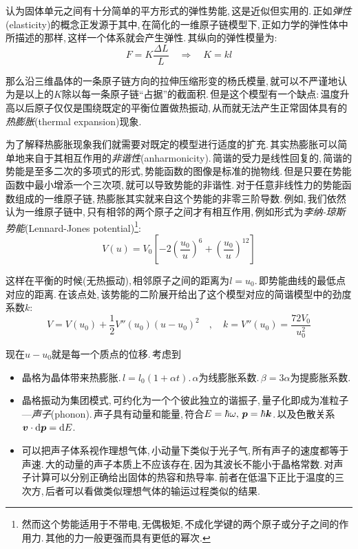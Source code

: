 认为固体单元之间有十分简单的平方形式的弹性势能,\,这是近似但实用的.\,正如\emph{弹性}(elasticity)的概念正发源于其中,\,在简化的一维原子链模型下,\,正如力学的弹性体中所描述的那样,\,这样一个体系就会产生弹性.\,其纵向的弹性模量为:
\[F=K\frac{\Delta L}{L}\quad \Rightarrow \quad K=kl\]

那么沿三维晶体的一条原子链方向的拉伸压缩形变的杨氏模量,\,就可以不严谨地认为是以上的$K$除以每一条原子链``占据''的截面积.\,但是这个模型有一个缺点:\,温度升高以后原子仅仅是围绕既定的平衡位置做热振动,\,从而就无法产生正常固体具有的\emph{热膨胀}(thermal expansion)现象.

为了解释热膨胀现象我们就需要对既定的模型进行适度的扩充.\,其实热膨胀可以简单地来自于其相互作用的\emph{非谐性}(anharmonicity).\,简谐的受力是线性回复的,\,简谐的势能是至多二次的多项式的形式,\,势能函数的图像是标准的抛物线.\,但是只要在势能函数中最小增添一个三次项,\,就可以导致势能的非谐性.\,对于任意非线性力的势能函数组成的一维原子链,\,热膨胀其实就来自这个势能的非零三阶导数.\,例如,\,我们依然认为一维原子链中,\,只有相邻的两个原子之间才有相互作用,\,例如形式为\emph{李纳-琼斯势能}(Lennard-Jones potential)\footnote{然而这个势能适用于不带电,\,无偶极矩,\,不成化学键的两个原子或分子之间的作用力.\,其他的力一般更强而具有更低的幂次.}:
\[V(u)=V_0  \left[ -2\left( \frac{u_0}{u} \right)^6+ \left( \frac{u_0}{u} \right)^{12}\right]  \]

这样在平衡的时候(无热振动),\,相邻原子之间的距离为$l=u_0$.\,即势能曲线的最低点对应的距离.\,在该点处,\,该势能的二阶展开给出了这个模型对应的简谐模型中的劲度系数$k$:
\[V=V(u_0)+\frac{1}{2}V''(u_0)(u-u_0)^2 \quad,\quad k=V''(u_0)=\frac{72V_0}{u_0^2}\]

现在$u-u_0$就是每一个质点的位移.\,考虑到











\begin{itemize}
	
	
	\item 晶格为晶体带来热膨胀.\,$l=l_0(1+\alpha t)$.\,$\alpha$为线膨胀系数.\,$\beta=3\alpha$为提膨胀系数.
\end{itemize}

\begin{itemize}
	\item 晶格振动为集团模式,\,可约化为一个个彼此独立的谐振子,\,量子化即成为准粒子---\emph{声子}(phonon).\,声子具有动量和能量,\,符合$E=\hbar\omega,\,\boldsymbol{p}=\hbar\boldsymbol{k}$.\,以及色散关系$\boldsymbol{v}\cdot \textrm{d} \boldsymbol{p}=\textrm{d} E$.
	\item 可以把声子体系视作理想气体,\,小动量下类似于光子气,\,所有声子的速度都等于声速.\,大的动量的声子本质上不应该存在,\,因为其波长不能小于晶格常数.\,对声子计算可以分别正确给出固体的热容和热导率.\,前者在低温下正比于温度的三次方,\,后者可以看做类似理想气体的输运过程类似的结果.
\end{itemize}


